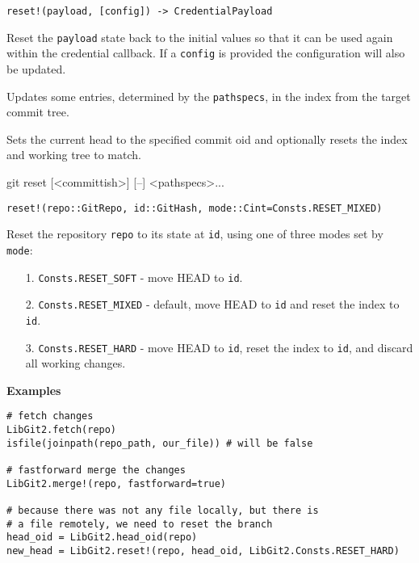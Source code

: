 \begin{adjustwidth}{2em}{0pt}


\begin{verbatim}
reset!(payload, [config]) -> CredentialPayload
\end{verbatim}

Reset the \texttt{payload} state back to the initial values so that it can be used again within the credential callback. If a \texttt{config} is provided the configuration will also be updated.



Updates some entries, determined by the \texttt{pathspecs}, in the index from the target commit tree.



Sets the current head to the specified commit oid and optionally resets the index and working tree to match.



git reset [<committish>] [–] <pathspecs>...




\begin{lstlisting}
reset!(repo::GitRepo, id::GitHash, mode::Cint=Consts.RESET_MIXED)
\end{lstlisting}

Reset the repository \texttt{repo} to its state at \texttt{id}, using one of three modes set by \texttt{mode}:

\begin{itemize}
\item[1. ] \texttt{Consts.RESET\_SOFT} - move HEAD to \texttt{id}.


\item[2. ] \texttt{Consts.RESET\_MIXED} - default, move HEAD to \texttt{id} and reset the index to \texttt{id}.


\item[3. ] \texttt{Consts.RESET\_HARD} - move HEAD to \texttt{id}, reset the index to \texttt{id}, and discard all working changes.

\end{itemize}
\textbf{Examples}


\begin{verbatim}
# fetch changes
LibGit2.fetch(repo)
isfile(joinpath(repo_path, our_file)) # will be false

# fastforward merge the changes
LibGit2.merge!(repo, fastforward=true)

# because there was not any file locally, but there is
# a file remotely, we need to reset the branch
head_oid = LibGit2.head_oid(repo)
new_head = LibGit2.reset!(repo, head_oid, LibGit2.Consts.RESET_HARD)
\end{verbatim}


\end{adjustwidth}
